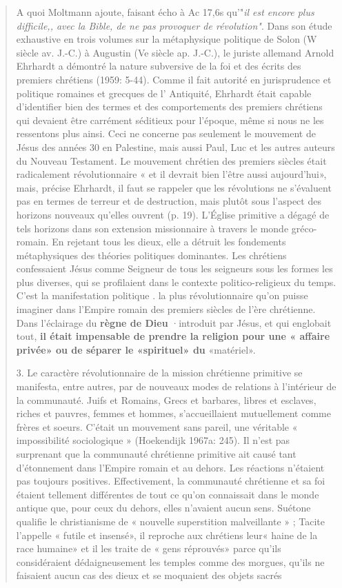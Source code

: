 \begin{quote}
    A quoi Moltmann ajoute, faisant écho à Ac 17,6s qu'"\textit{il est encore plus difficile,, avec la Bible, de ne pas provoquer de
révolution"}. Dans son étude exhaustive en trois volumes sur la métaphysique
politique de Solon (W siècle av. J.-C.) à Augustin (Ve siècle ap. J.-C.),
le juriste allemand Arnold Ehrhardt a démontré la nature subversive de
la foi et des écrits des premiers chrétiens (1959: 5-44). Comme il fait
autorité en jurisprudence et politique romaines et grecques de
l' Antiquité, Ehrhardt était capable d'identifier bien des termes et des
comportements des premiers chrétiens qui devaient être carrément
séditieux pour l'époque, même si nous ne les ressentons plus ainsi.
Ceci ne concerne pas seulement le mouvement de Jésus des années 30
en Palestine, mais aussi Paul, Luc et les autres auteurs du Nouveau
Testament. Le mouvement chrétien des premiers siècles était radicalement
révolutionnaire « et il devrait bien l'être aussi aujourd'hui»,
mais, précise Ehrhardt, il faut se rappeler que les révolutions ne
s'évaluent pas en termes de terreur et de destruction, mais plutôt sous
l'aspect des horizons nouveaux qu'elles ouvrent (p. 19). L'Église
primitive a dégagé de tels horizons dans son extension missionnaire à
travers le monde gréco-romain. En rejetant tous les dieux, elle a détruit
les fondements métaphysiques des théories politiques dominantes. Les
chrétiens confessaient Jésus comme Seigneur de tous les seigneurs
sous les formes les plus diverses, qui se profilaient dans le contexte
politico-religieux du temps. C'est la manifestation politique . la plus
révolutionnaire qu'on puisse imaginer dans l'Empire romain des
premiers siècles de l'ère chrétienne. Dans l'éclairage du \textbf{règne de Dieu}
·introduit par Jésus, et qui englobait tout, \textbf{il était impensable de prendre
la religion pour une « affaire privée» ou de séparer le «spirituel» du}
«matériel».

3. Le caractère révolutionnaire de la mission chrétienne primitive se
manifesta, entre autres, par de nouveaux modes de relations à l'intérieur de la communauté. Juifs et Romains, Grecs et barbares,
libres et esclaves, riches et pauvres, femmes et hommes, s'accueillaient
mutuellement comme frères et soeurs. C'était un mouvement sans
pareil, une véritable « impossibilité sociologique » (Hoekendijk
1967a: 245). Il n'est pas surprenant que la communauté chrétienne
primitive ait causé tant d'étonnement dans l'Empire romain et au
dehors. Les réactions n'étaient pas toujours positives. Effectivement, la
communauté chrétienne et sa foi étaient tellement différentes de tout
ce qu'on connaissait dans le monde antique que, pour ceux du dehors,
elles n'avaient aucun sens. Suétone qualifie le christianisme de
« nouvelle superstition malveillante » ; Tacite l'appelle « futile et
insensé», il reproche aux chrétiens leur« haine de la race humaine» et
il les traite de « gens réprouvés» parce qu'ils considéraient
dédaigneusement les temples comme des morgues, qu'ils ne faisaient
aucun cas des dieux et se moquaient des objets sacrés 

\end{quote}

